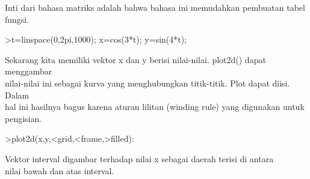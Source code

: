 \documentclass[a4paper,10pt]{article}
\begin{document}
\begin{eulernotebook}
\begin{eulercomment}
\begin{eulercomment}
\begin{eulercomment}
\begin{eulercomment}
\begin{eulercomment}
\begin{eulercomment}
\begin{eulerprompt}
\end{eulerprompt}
\begin{eulercomment}
Inti dari bahasa matriks adalah bahwa bahasa ini memudahkan pembuatan tabel fungsi.
\end{eulercomment}
\begin{eulerprompt}
>t=linspace(0,2pi,1000); x=cos(3*t); y=sin(4*t);
\end{eulerprompt}
\begin{eulercomment}
Sekarang kita memiliki vektor x dan y berisi nilai-nilai. plot2d() dapat menggambar\\
nilai-nilai ini sebagai kurva yang menghubungkan titik-titik. Plot dapat diisi. Dalam\\
hal ini hasilnya bagus karena aturan lilitan (winding rule) yang digunakan untuk\\
pengisian.
\end{eulercomment}
\begin{eulerprompt}
>plot2d(x,y,<grid,<frame,>filled):
\end{eulerprompt}
\begin{eulercomment}
Vektor interval digambar terhadap nilai x sebagai daerah terisi di antara\\
nilai bawah dan atas interval.


\end{eulercomment}
\end{eulercomment}
\end{eulercomment}
\end{eulercomment}
\end{eulercomment}
\end{eulercomment}
\end{eulercomment}
\end{eulernotebook}
\end{document}
